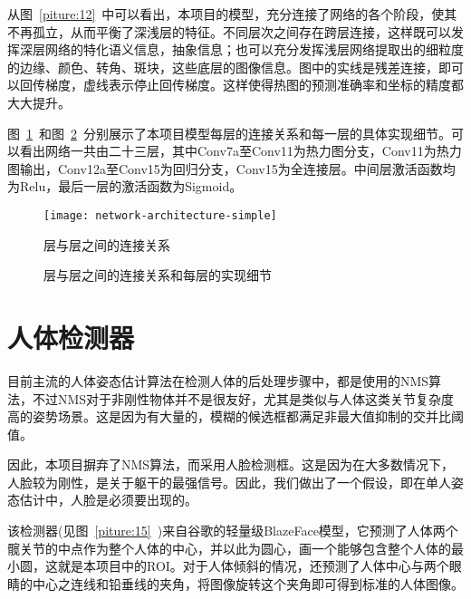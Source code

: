 从图~\ref{piture:12}~中可以看出，本项目的模型，充分连接了网络的各个阶段，使其不再孤立，从而平衡了深浅层的特征。不同层次之间存在跨层连接，这样既可以发挥深层网络的特化语义信息，抽象信息；也可以充分发挥浅层网络提取出的细粒度的边缘、颜色、转角、斑块，这些底层的图像信息。图中的实线是残差连接，即可以回传梯度，虚线表示停止回传梯度。这样使得热图的预测准确率和坐标的精度都大大提升。

图~\ref{piture:13}~和图~\ref{piture:14}~分别展示了本项目模型每层的连接关系和每一层的具体实现细节。可以看出网络一共由二十三层，其中Conv7a至Conv11为热力图分支，Conv11为热力图输出，Conv12a至Conv15为回归分支，Conv15为全连接层。中间层激活函数均为Relu，最后一层的激活函数为Sigmoid。

\begin{figure}
\centering
\texttt{[image: network-architecture-simple]}
\caption{层与层之间的连接关系}
\label{piture:13}
\end{figure}

\begin{figure}[!h]
	\centering
	\begin{sideways}
		\begin{minipage}{\textheight}
			\centering
			\caption{层与层之间的连接关系和每层的实现细节}
			\label{piture:14}
		\end{minipage}
	\end{sideways}
\end{figure}

\section{人体检测器}

目前主流的人体姿态估计算法在检测人体的后处理步骤中，都是使用的NMS算法，不过NMS对于非刚性物体并不是很友好，尤其是类似与人体这类关节复杂度高的姿势场景。这是因为有大量的，模糊的候选框都满足非最大值抑制的交并比阈值。

因此，本项目摒弃了NMS算法，而采用人脸检测框。这是因为在大多数情况下，人脸较为刚性，是关于躯干的最强信号。因此，我们做出了一个假设，即在单人姿态估计中，人脸是必须要出现的。

该检测器(见图~\ref{piture:15}~)来自谷歌的轻量级BlazeFace模型，它预测了人体两个髋关节的中点作为整个人体的中心，并以此为圆心，画一个能够包含整个人体的最小圆，这就是本项目中的ROI。对于人体倾斜的情况，还预测了人体中心与两个眼睛的中心之连线和铅垂线的夹角，将图像旋转这个夹角即可得到标准的人体图像。

